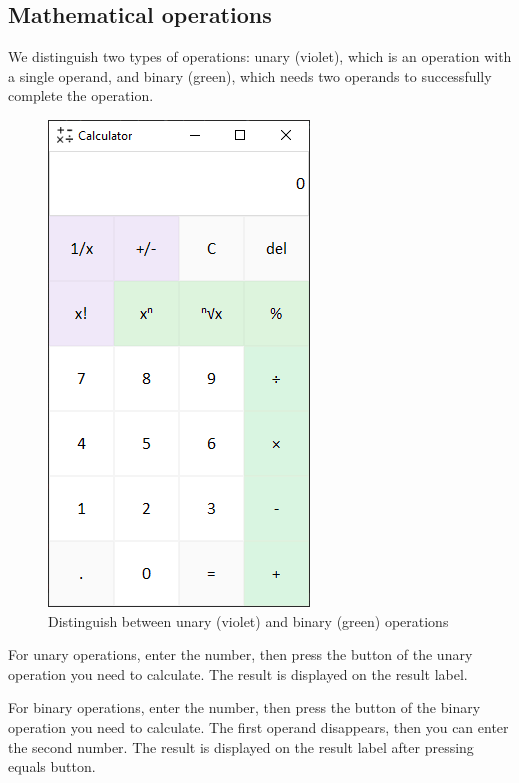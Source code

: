 \documentclass[12pt]{article}
\begin{document}
\subsection{Mathematical operations}
We distinguish two types of operations: unary (violet), which is an operation with a single operand, and binary (green), which needs two operands to successfully complete the operation.

\begin{figure}[H]
\centering
  \includegraphics[scale=1]{unaryvsbinary.png}
  \caption{Distinguish between unary (violet) and binary (green) operations}
  \label{fig:operations}
\end{figure}

For unary operations, enter the number, then press the button of the unary operation you need to calculate. The result is displayed on the result label.

For binary operations, enter the number, then press the button of the binary operation you need to calculate. The first operand disappears, then you can enter the second number. The result is displayed on the result label after pressing equals button.
\newpage
\end{document}
